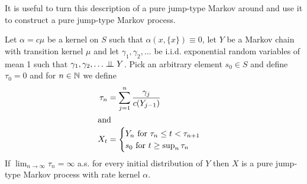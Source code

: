 It is useful to turn this description of  a pure jump-type Markov
around and use it to construct a pure jump-type Markov process.  

\begin{thm}Let $\alpha = c \mu$ be a kernel on $S$ such that
  $\alpha(x, \lbrace x \rbrace) \equiv 0$, let $Y$ be a Markov chain
  with transition kernel $\mu$ and let $\gamma_1, \gamma_2, \dotsc$ be
  i.i.d. exponential random variables of mean 1 such that $\gamma_1,
  \gamma_2, \dotsc \perp \! \! \! \perp Y$.  Pick an arbitrary element $s_0
  \in S$ and define $\tau_0 = 0$ and for $n
  \in \mathbb{N}$ we define
\begin{align*}
\tau_n &= \sum_{j=1}^n  \frac{\gamma_j}{c(Y_{j-1})} \\
\intertext{and}
X_t &= \begin{cases}
Y_n \text{ for $\tau_n \leq t < \tau_{n+1}$} \\
s_0 \text{ for $t \geq \sup_n \tau_n$} \\
\end{cases}
\end{align*}
If $\lim_{n \to \infty} \tau_n = \infty$ a.s. for every initial distribution
  of $Y$ then $X$ is a pure jump-type Markov process with rate kernel $\alpha$.
\end{thm}

